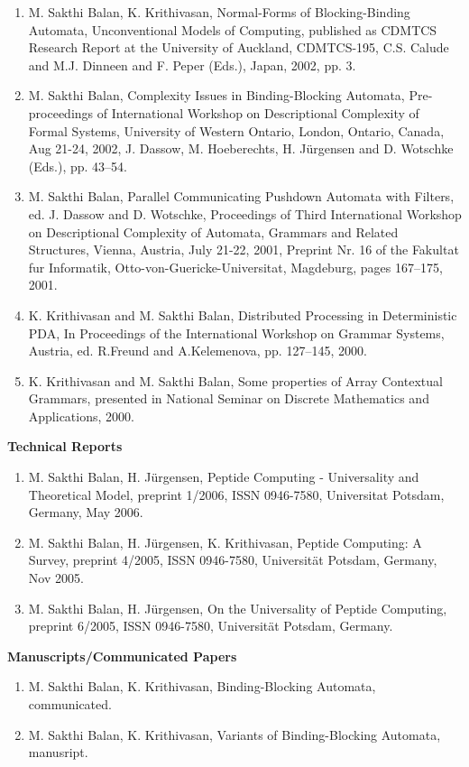 \documentclass[11pt]{article}
\begin{document}
\begin{enumerate}
\item M. Sakthi Balan, K. Krithivasan, Normal-Forms of
Blocking-Binding Automata, Unconventional Models of Computing,
published as CDMTCS Research Report at the University of Auckland,
CDMTCS-195, C.S. Calude and M.J. Dinneen and F. Peper (Eds.), Japan,
2002, pp. 3.
\item M. Sakthi Balan, Complexity Issues in Binding-Blocking Automata,
Pre-proceedings of International Workshop on Descriptional Complexity
of Formal Systems, University of Western Ontario, London, Ontario,
Canada, Aug 21-24, 2002, J. Dassow, M. Hoeberechts, H. J\"{u}rgensen and
D. Wotschke (Eds.), pp. 43--54.
\item M. Sakthi Balan, Parallel Communicating Pushdown Automata with
Filters, ed. J. Dassow and D. Wotschke, Proceedings of Third
International Workshop on Descriptional Complexity of Automata,
Grammars and Related Structures, Vienna, Austria, July 21-22, 2001,
Preprint Nr. 16 of the Fakultat fur Informatik,
Otto-von-Guericke-Universitat, Magdeburg, pages 167--175, 2001.
\item K. Krithivasan and M. Sakthi Balan, Distributed Processing in
Deterministic PDA, In Proceedings of the International Workshop on
Grammar Systems, Austria, ed. R.Freund and A.Kelemenova, pp.  127--145,
2000.
\item K. Krithivasan and M. Sakthi Balan, Some properties of Array
Contextual Grammars, presented in National Seminar on Discrete
Mathematics and Applications, 2000.
\end{enumerate}

{\large \bf Technical Reports}

\begin{enumerate}
\item M. Sakthi Balan, H. J\"{u}rgensen, Peptide Computing - Universality
and Theoretical Model, preprint 1/2006, ISSN 0946-7580, Universitat
Potsdam, Germany, May 2006.
\item M. Sakthi Balan, H. J\"{u}rgensen, K. Krithivasan, Peptide
  Computing: A Survey, preprint 4/2005, ISSN 0946-7580,
  Universit\"{a}t Potsdam, Germany, Nov 2005.
\item M. Sakthi Balan, H. J\"{u}rgensen, On the Universality of
Peptide Computing, preprint 6/2005, ISSN 0946-7580, Universit\"{a}t
Potsdam, Germany.
\end{enumerate}

{\large \bf Manuscripts/Communicated Papers}

\begin{enumerate}
\item M. Sakthi Balan, K. Krithivasan, Binding-Blocking Automata, communicated.
\item M. Sakthi Balan, K. Krithivasan, Variants of Binding-Blocking
Automata, manusript.
\end{enumerate}
\end{document}
